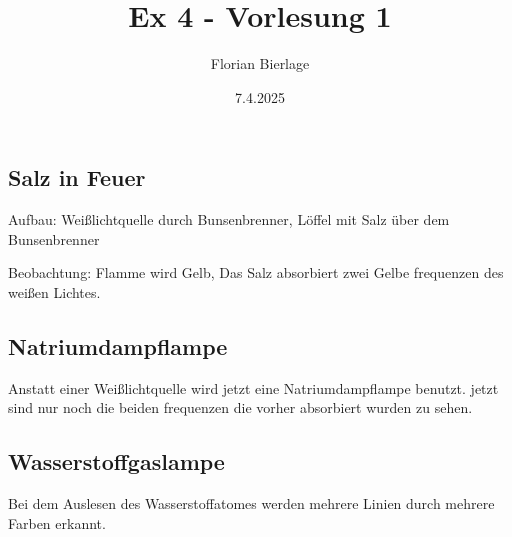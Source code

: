 \documentclass[]{scrartcl}
\title{Ex 4 - Vorlesung 1}
\author{Florian Bierlage}
\date{7.4.2025}
\begin{document}
\maketitle
\newpage
\tableofcontents
\newpage

 
\subsection{Salz in Feuer}

Aufbau: Weißlichtquelle durch Bunsenbrenner, Löffel mit Salz über dem Bunsenbrenner

Beobachtung: Flamme wird Gelb, Das Salz absorbiert zwei Gelbe frequenzen des weißen Lichtes.

\subsection{Natriumdampflampe}

Anstatt einer Weißlichtquelle wird jetzt eine Natriumdampflampe benutzt. jetzt sind nur noch die beiden frequenzen die vorher absorbiert wurden zu sehen.

\subsection{Wasserstoffgaslampe}

Bei dem Auslesen des Wasserstoffatomes werden mehrere Linien durch mehrere Farben erkannt.
\end{document}
